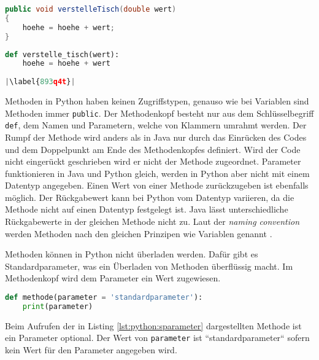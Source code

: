 \begin{minipage}{.5\linewidth}
\begin{lstlisting}[language=java,caption={Methoden in Java},captionpos=b,label={lst:java:methode},frame=none]
public void verstelleTisch(double wert)
{
    hoehe = hoehe + wert;
}
\end{lstlisting}
\end{minipage}
\begin{minipage}{.5\linewidth}
\begin{lstlisting}[language=python,caption={Methode in Python},captionpos=b,label={lst:python:methode},frame=l,escapechar=|]
def verstelle_tisch(wert):
    hoehe = hoehe + wert
    
|\label{893q4t}|
\end{lstlisting}
\end{minipage}

Methoden in Python haben keinen Zugriffstypen, genauso wie bei Variablen sind Methoden immer \texttt{public}. Der Methodenkopf besteht nur aus dem Schlüsselbegriff \texttt{def}, dem Namen und Parametern, welche von Klammern umrahmt werden. Der Rumpf der Methode wird anders als in Java nur durch das Einrücken des Codes und dem Doppelpunkt am Ende des Methodenkopfes definiert. Wird der Code nicht eingerückt geschrieben wird er nicht der Methode zugeordnet. Parameter funktionieren in Java und Python gleich, werden in Python aber nicht mit einem Datentyp angegeben. Einen Wert von einer Methode zurückzugeben ist ebenfalls möglich. Der Rückgabewert kann bei Python vom Datentyp variieren, da die Methode nicht auf einen Datentyp festgelegt ist. Java lässt unterschiedliche Rückgabewerte in der gleichen Methode nicht zu. Laut der \textit{naming convention} werden Methoden nach den gleichen Prinzipen wie Variablen genannt \cite{Microsoft:CapCon}\cite{Ims:h-s}. \cite{Louis:2010}\cite{Python3:Buch}
\par
Methoden können in Python nicht überladen werden. Dafür gibt es Standardparameter, was ein Überladen von Methoden überflüssig macht. Im Methodenkopf wird dem Parameter ein Wert zugewiesen.

\begin{lstlisting}[language=python,caption={Methode in Python mit Standartparameter},captionpos=b,label={lst:python:sparameter},frame=none]
def methode(parameter = 'standardparameter'):
    print(parameter)
\end{lstlisting}

Beim Aufrufen der in Listing \ref{lst:python:sparameter} dargestellten Methode ist ein Parameter optional. Der Wert von \texttt{parameter} ist “standardparameter“ sofern kein Wert für den Parameter angegeben wird.\par
